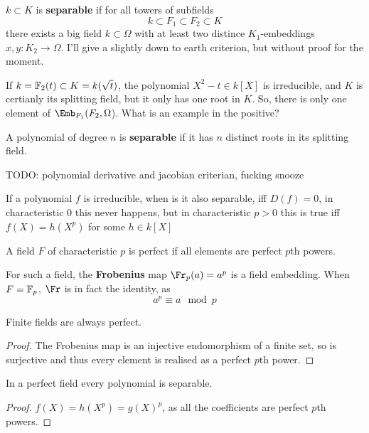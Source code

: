 \documentclass{article}
\begin{document}
\begin{definition}
    $k\subset K$ is \textbf{separable} if for all towers of subfields \[
    k \subset F_1 \subset F_2 \subset K
    \] there exists a big field $k\subset\Omega$ with at least two distince $K_1$-embeddings $x,y:K_2\rightarrow \Omega$.
    I'll give a slightly down to earth criterion, but without proof for the moment.
\end{definition}


If $k=\mathbb{F}_2(t)\subset K = k(\sqrt{t})$, the polynomial $X^2-t\in k[X]$ is irreducible, and $K$ is certianly its splitting field, but it only has one root in $K$. So, there is only one element of $\Emb_{F_1}(F_2,\Omega$). What is an example in the positive?

\begin{definition}
    A polynomial of degree $n$ is \textbf{separable} if it has $n$ distinct roots in its splitting field.
\end{definition}

TODO: polynomial derivative and jacobian criterian, fucking snooze

If a polynomial $f$ is irreducible, when is it also separable, iff $D(f)=0$, in characteristic $0$ this never happens, but in characteristic $p>0$ this is true iff $f(X)=h(X^p)$ for some $h\in k[X]$

\begin{definition}
    A field $F$ of characteristic $p$ is perfect if all elements are perfect $p$th powers.
\end{definition}

For such a field, the \textbf{Frobenius} map $\Fr_p(a)=a^p$ is a field embedding. When $F=\mathbb{F}_p$, $\Fr$ is in fact the identity, as \[
a^p\equiv a\mod{p}
\]

\begin{proposition}
    Finite fields are always perfect.
    \begin{proof}
        The Frobenius map is an injective endomorphism of a finite set, so is surjective and thus every element is realised as a perfect $p$th power.
    \end{proof}
\end{proposition}

\begin{proposition}
    In a perfect field every polynomial is separable.\begin{proof}
        $f(X)=h(X^p)=g(X)^p$, as all the coefficients are perfect $p$th powers.
    \end{proof}
\end{proposition}
\end{document}
